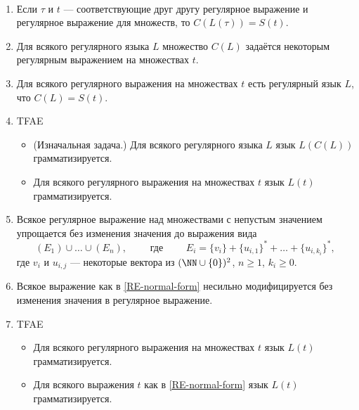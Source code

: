\documentclass[12pt,a4paper]{article}
\begin{document}
\begin{problem}{8}
\begin{enumerate}
                \begin{lemma}\ 
                    \begin{enumerate}
                        \item Если $\tau$ и $t$ --- соответствующие друг другу регулярное выражение и регулярное выражение для множеств, то $C(L(\tau)) = S(t)$.
                        \item Для всякого регулярного языка $L$ множество $C(L)$ задаётся некоторым регулярным выражением на множествах $t$.
                        \item Для всякого регулярного выражения на множествах $t$ есть регулярный язык $L$, что $C(L) = S(t)$.
                        \item TFAE
                            \begin{itemize}
                                \item (Изначальная задача.) Для всякого регулярного языка $L$ язык $L(C(L))$ грамматизируется.
                                \item Для всякого регулярного выражения на множествах $t$ язык $L(t)$ грамматизируется.
                            \end{itemize}
                        \item \label{RE-normal-form} Всякое регулярное выражение над множествами с непустым значением упрощается без изменения значения до выражения вида
                            \[
                                (E_1) \cup \dots \cup (E_n),
                                \qquad \text{ где } \qquad
                                E_i = \{v_i\} + \{u_{i, 1}\}^* + \dots + \{u_{i, k_i}\}^*,
                            \]
                            где $v_i$ и $u_{i, j}$ --- некоторые вектора из $(\NN \cup \{0\})^2$, $n \geqslant 1$, $k_i \geqslant 0$.
                        \item Всякое выражение как в \ref{RE-normal-form} несильно модифицируется без изменения значения в регулярное выражение.
                        \item TFAE
                            \begin{itemize}
                                \item Для всякого регулярного выражения на множествах $t$ язык $L(t)$ грамматизируется.
                                \item Для всякого выражения $t$ как в \ref{RE-normal-form} язык $L(t)$ грамматизируется.
                            \end{itemize}
                    \end{enumerate}
                \end{lemma}


\end{enumerate}
\end{problem}
\end{document}
